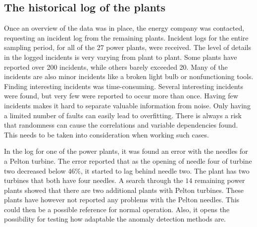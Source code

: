     \subsection{The historical log of the plants }
        Once an overview of the data was in place, the energy company was contacted, requesting an incident log from the remaining plants. Incident logs for the entire sampling period, for all of the $27$ power plants, were received. The level of details in the logged incidents is very varying from plant to plant. Some plants have reported over 200 incidents, while others barely exceeded 20. Many of the incidents are also minor incidents like a broken light bulb or nonfunctioning tools. Finding interesting incidents was time-consuming. Several interesting incidents were found, but very few were reported to occur more than once. Having few incidents makes it hard to separate valuable information from noise. Only having a limited number of faults can easily lead to overfitting. There is always a risk that randomness can cause the correlations and variable dependencies found. This needs to be taken into consideration when working such cases.  
        
        In the log for one of the power plants, it was found an error with the needles for a Pelton turbine. The error reported that as the opening of needle four of turbine two decreased below $46\%$, it started to lag behind needle two. The plant has two turbines that both have four needles. A search through the $14$ remaining power plants showed that there are two additional plants with Pelton turbines. These plants have however not reported any problems with the Pelton needles. This could then be a possible reference for normal operation. Also, it opens the possibility for testing how adaptable the anomaly detection methods are. 
        
        
